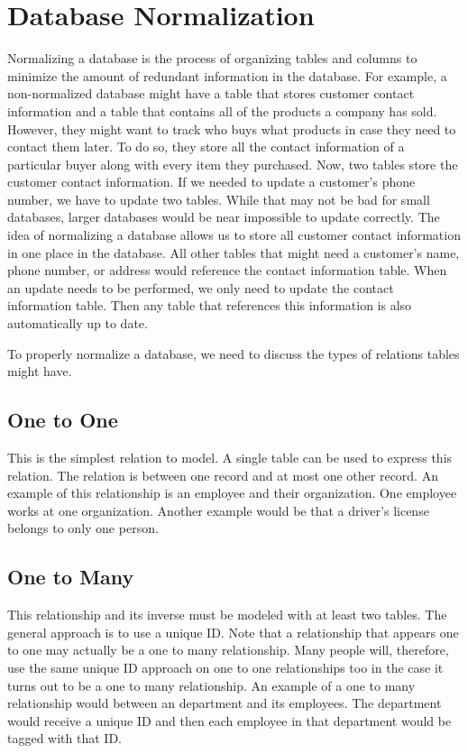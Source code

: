 \renewcommand{\lsql}[1]{\lstinline[language=SQL,prebreak=]!#1!}

\label{lab:advancedsql}

\section*{Database Normalization}
Normalizing a database is the process of organizing tables and columns to minimize the amount of redundant information in the database.
For example, a non-normalized database might have a table that stores customer contact information and a table that contains all of the products a company has sold.
However, they might want to track who buys what products in case they need to contact them later. To do so, they store all the contact information of a particular buyer along with every item they purchased.
Now, two tables store the customer contact information.
If we needed to update a customer's phone number, we have to update two tables.
While that may not be bad for small databases, larger databases would be near impossible to update correctly.
The idea of normalizing a database allows us to store all customer contact information in one place in the database.
All other tables that might need a customer's name, phone number, or address would reference the contact information table.
When an update needs to be performed, we only need to update the contact information table.
Then any table that references this information is also automatically up to date.

To properly normalize a database, we need to discuss the types of relations tables might have.
\subsection*{One to One}
This is the simplest relation to model.
A single table can be used to express this relation.
The relation is between one record and at most one other record.
An example of this relationship is an employee and their organization.
One employee works at one organization.
Another example would be that a driver's license belongs to only one person.

\subsection*{One to Many}
This relationship and its inverse must be modeled with at least two tables.
The general approach is to use a unique ID.
Note that a relationship that appears one to one may actually be a one to many relationship.
Many people will, therefore, use the same unique ID approach on one to one relationships too in the case it turns out to be a one to many relationship.
An example of a one to many relationship would between an department and its employees.
The department would receive a unique ID and then each employee in that department would be tagged with that ID.

